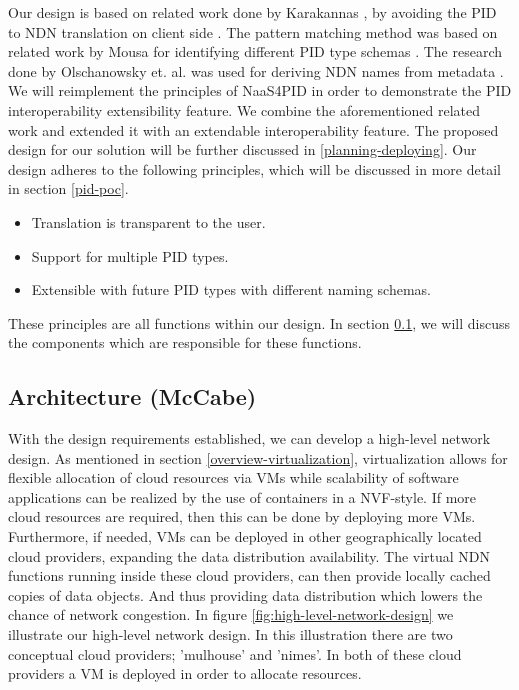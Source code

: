 Our design is based on related work done by Karakannas \cite{icn-bd}, by avoiding the PID to NDN translation on client side \cite{icn-bd}. The pattern matching method was based on related work by Mousa for identifying different PID type schemas \cite{ndn-app-aware}. The research done by Olschanowsky et. al. was used for deriving NDN names from metadata \cite{ndn-man}.
We will reimplement the principles of NaaS4PID in order to demonstrate the PID interoperability extensibility feature.
We combine the aforementioned related work and extended it with an extendable interoperability feature. The proposed design for our solution will be further discussed in \ref{planning-deploying}.
Our design adheres to the following principles, which will be discussed in more detail in section \ref{pid-poc}.
 
\begin{itemize}
    \item{Translation is transparent to the user.}
    \item{Support for multiple PID types.}
    \item{Extensible with future PID types with different naming schemas.}
\end{itemize}

These principles are all functions within our design. In section \ref{planning-architecture}, we will discuss the components which are responsible for these functions.

\subsection{Architecture (McCabe)}
\label{planning-architecture}
With the design requirements established, we can develop a high-level network design. As mentioned in section \ref{overview-virtualization}, virtualization allows for flexible allocation of cloud resources via VMs while scalability of software applications can be realized by the use of containers in a NVF-style. If more cloud resources are required, then this can be done by deploying more VMs. Furthermore, if needed, VMs can be deployed in other geographically located cloud providers, expanding the data distribution availability. The virtual NDN functions running inside these cloud providers, can then provide locally cached copies of data objects. And thus providing data distribution which lowers the chance of network congestion. In figure \ref{fig:high-level-network-design} we illustrate our high-level network design. In this illustration there are two conceptual cloud providers; 'mulhouse' and 'nimes'. In both of these cloud providers a VM is deployed in order to allocate resources.

